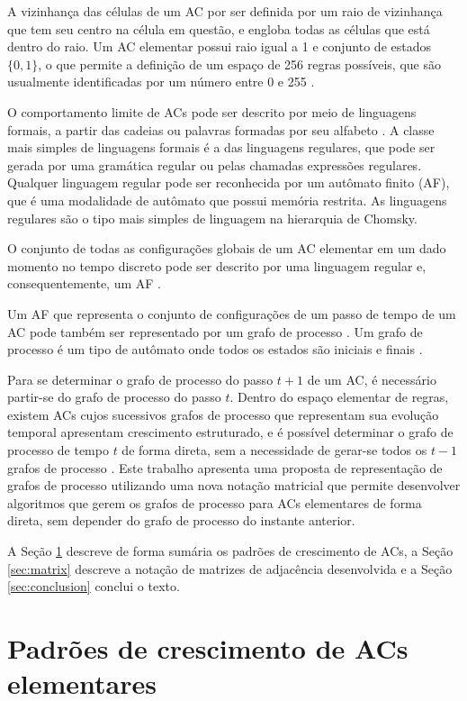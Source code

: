 \documentclass[a4,11pt]{article}
\begin{document}
A vizinhança das células de um AC por ser definida por
um raio de vizinhança que tem seu centro na célula em questão, e engloba
todas as células que está dentro do raio. Um AC
elementar possui raio igual a 1 e conjunto de estados $\{0,1\}$,
o que permite a definição de um espaço de 256 regras possíveis, que
são usualmente identificadas por um número entre 0 e 255
\cite{wolfram1984}.

O comportamento limite de ACs pode ser descrito por meio
de linguagens formais, a partir das cadeias ou
palavras formadas por seu alfabeto \cite{lewis2008}.
A classe mais simples de linguagens formais é
a das linguagens regulares, que pode ser gerada por uma gramática regular ou
pelas chamadas expressões regulares. Qualquer linguagem regular pode ser
reconhecida por um autômato finito (AF), que é uma modalidade de autômato que
possui memória restrita. As linguagens regulares são o tipo mais simples
de linguagem na hierarquia de Chomsky.

O conjunto de todas as configurações globais de um AC
elementar em um dado momento no tempo discreto pode ser descrito por
uma linguagem regular e, consequentemente, um AF
\cite{wolfram1984}.

Um AF que representa o conjunto de configurações de um passo de tempo de um
AC pode também ser representado por um grafo de processo \cite{wolfram1984}.
Um grafo de processo é um tipo de autômato onde todos os estados são
iniciais e finais \cite{hanson1992}.

Para se determinar o grafo de processo do passo $t+1$ de um AC, é
necessário partir-se do grafo de processo do passo $t$. Dentro do espaço
elementar de regras, existem ACs cujos sucessivos grafos de processo que
representam sua evolução temporal apresentam crescimento
estruturado, e é possível determinar o grafo de processo de tempo $t$ de
forma direta, sem a necessidade de gerar-se todos os $t-1$ grafos de
processo \cite{trafaniuc2004}. Este trabalho apresenta uma proposta de
representação de grafos de processo utilizando uma nova notação matricial
que permite desenvolver algoritmos que gerem os grafos de processo para
ACs elementares de forma direta, sem depender do grafo de processo do
instante anterior.

A Seção \ref{sec:ca} descreve de forma sumária os padrões de crescimento
de ACs, a Seção \ref{sec:matrix} descreve a notação de matrizes de adjacência
desenvolvida e a Seção \ref{sec:conclusion} conclui o texto.

\section{Padrões de crescimento de ACs elementares}\label{sec:ca}
\end{document}
